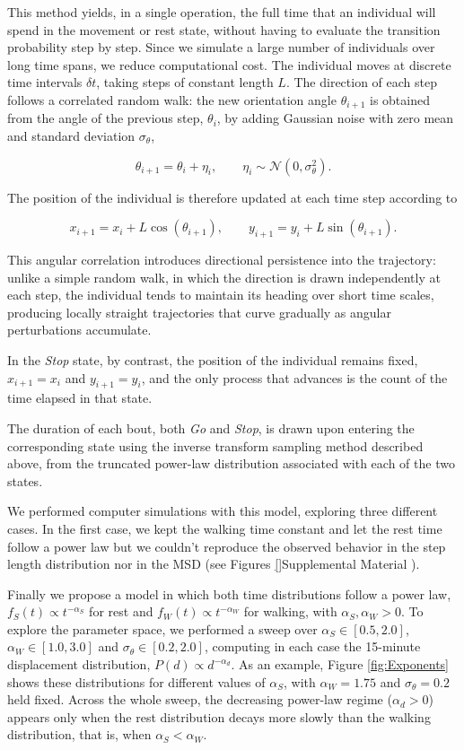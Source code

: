 \documentclass[a4paper]{article}
\begin{document}
This method yields, in a single operation, the full time that an individual will spend in the movement or rest state, without having to
evaluate the transition probability step by step. Since we simulate a large number of individuals over long time spans, we reduce computational cost.
The individual moves at discrete time intervals $\delta t$, taking steps of constant length $L$. The direction of
each step follows a correlated random walk: the new orientation angle $\theta_{i+1}$ is obtained from
the angle of the previous step, $\theta_i$, by adding Gaussian noise with zero mean and standard deviation $\sigma_\theta$,

\begin{equation}
    \theta_{i+1} = \theta_i + \eta_i, \qquad \eta_i \sim \mathcal{N}(0,\sigma_\theta^2).
\end{equation}

The position of the individual is therefore updated at each time step according to

\begin{equation}
    x_{i+1} = x_i + L\cos(\theta_{i+1}), \qquad y_{i+1} = y_i + L\sin(\theta_{i+1}).
\end{equation}

This angular correlation introduces directional persistence into the trajectory: unlike a simple random walk, in which the direction is drawn
independently at each step, the individual tends to maintain its heading over short time scales, producing locally straight trajectories that
curve gradually as angular perturbations accumulate.

In the \textit{Stop} state, by contrast, the position of the individual remains fixed, $x_{i+1}=x_i$ and $y_{i+1}=y_i$, and the only process
that advances is the count of the time elapsed in that state.

The duration of each bout, both \textit{Go} and \textit{Stop}, is drawn upon entering the corresponding state using the inverse transform
sampling method described above, from the truncated power-law distribution associated with each of the two states.

We performed computer simulations with this model, exploring three different cases. In the first case, we kept the walking time constant and let the rest time follow a power law but we couldn't reproduce the observed behavior in the step length distribution nor in the MSD (see Figures \ref{}Supplemental Material ). 

Finally we propose a model in which both time distributions follow a power law, $f_S(t) \propto t^{-\alpha_S}$ for rest and
$f_W(t) \propto t^{-\alpha_W}$ for walking, with $\alpha_S, \alpha_W > 0$. To explore the parameter space, we performed a sweep over
$\alpha_S \in [0.5, 2.0]$, $\alpha_W \in [1.0, 3.0]$ and $\sigma_\theta \in [0.2, 2.0]$, computing in each case the 15-minute displacement
distribution, $P(d) \propto d^{-\alpha_d}$. As an example, Figure \ref{fig:Exponents} shows these distributions for different values of
$\alpha_S$, with $\alpha_W = 1.75$ and $\sigma_\theta = 0.2$ held fixed. Across the whole sweep, the decreasing power-law regime
($\alpha_d > 0$) appears only when the rest distribution decays more slowly than the walking distribution, that is, when
$\alpha_S < \alpha_W$.
\end{document}
